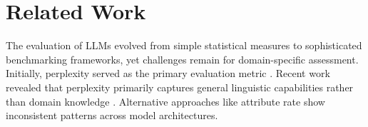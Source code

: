 \documentclass[10pt]{article}
\newcommand{\revision}[1]{\textcolor{black}{#1}}
\begin{document}



\section{Related Work} \vspace*{-.25cm}
\label{sec:related-work}
The evaluation of LLMs evolved from simple statistical measures to sophisticated benchmarking frameworks, yet challenges remain for domain-specific assessment. Initially, perplexity served as the primary evaluation metric \citep{jelinek1977perplexity, gururangan2021demix, yildiz2024investigating}. Recent work revealed that perplexity primarily captures general linguistic capabilities rather than domain knowledge \citep{xu2024beyond, meister2021language, oncel2024adaptation}. Alternative approaches like attribute rate \citep{geva2023dissecting} show inconsistent patterns across model architectures.
\end{document}
